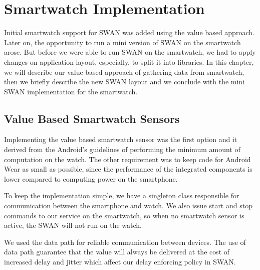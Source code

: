 
\chapter{Smartwatch Implementation} %

\label{Chapter5} %


Initial smartwatch support for SWAN was added using the value based approach. Later on, the opportunity to run a mini version of SWAN on the smartwatch arose. But before we were able to 
run SWAN on the smartwatch, we had to apply changes on application layout, especially, to split it into libraries. In this chapter, we will describe our value based approach of gathering data from
smartwatch, then we briefly describe the new SWAN layout and we conclude with the mini SWAN implementation for the smartwatch.

\section{Value Based Smartwatch Sensors }
Implementing the value based smartwatch sensor was the first option and it derived from the Android's guidelines of performing the minimum amount of computation on the watch.
The other requirement was to keep code for Android Wear as small as possible, since the performance of the integrated components is lower compared to computing power on the smartphone.

To keep the implementation simple, we have a singleton class  responsible for communication between the smartphone and watch. We also issue start and stop commands to our service on the smartwatch,
so when no smartwatch sensor is active, the SWAN will not run on the watch.

We used the data path \cite{android_wear_datapath} for reliable communication between devices. The use of data path guarantee that the value will always be delivered at the cost of increased delay
and jitter\cite{jitter_ref} which affect our delay enforcing policy in SWAN.

